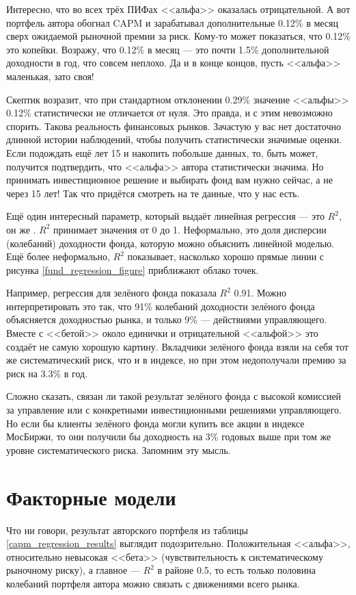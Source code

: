 Интересно, что во всех трёх ПИФах <<альфа>> оказалась отрицательной. А вот портфель автора обогнал CAPM и зарабатывал дополнительные 0.12\% в месяц сверх ожидаемой рыночной премии за риск. Кому-то может показаться, что 0.12\% это копейки. Возражу, что 0.12\% в месяц --- это почти 1.5\% дополнительной доходности в год, что совсем неплохо. Да и в конце концов, пусть <<альфа>> маленькая, зато своя!

Скептик возразит, что при стандартном отклонении 0.29\% значение <<альфы>> 0.12\% статистически не отличается от нуля. Это правда, и с этим невозможно спорить. Такова реальность финансовых рынков. Зачастую у вас нет достаточно длинной истории наблюдений, чтобы получить статистически значимые оценки. Если подождать ещё лет 15 и накопить побольше данных, то, быть может, получится подтвердить, что <<альфа>> автора статистически значима. Но принимать инвестиционное решение и выбирать фонд вам нужно сейчас, а не через 15 лет! Так что придётся смотреть на те данные, что у нас есть.

Ещё один интересный параметр, который выдаёт линейная регрессия --- это $R^2$, он же . $R^2$ принимает значения от 0 до 1. Неформально, это доля дисперсии (колебаний) доходности фонда, которую можно объяснить линейной моделью. Ещё более неформально, $R^2$ показывает, насколько хорошо прямые линии с рисунка \ref{fund_regression_figure} приближают облако точек.

Например, регрессия для зелёного фонда показала $R^2$ 0.91. Можно интерпретировать это так, что 91\% колебаний доходности зелёного фонда объясняется доходностью рынка, и только 9\% --- действиями управляющего. Вместе с <<бетой>> около единички и отрицательной <<альфой>> это создаёт не самую хорошую картину. Вкладчики зелёного фонда взяли на себя тот же систематический риск, что и в индексе, но при этом недополучали премию за риск на 3.3\% в год. 

Сложно сказать, связан ли такой результат зелёного фонда с высокой комиссией за управление или с конкретными инвестиционными решениями управляющего. Но если бы клиенты зелёного фонда могли купить все акции в индексе МосБиржи, то они получили бы доходность на 3\% годовых выше при том же уровне систематического риска. Запомним эту мысль.

\section*{Факторные модели}

Что ни говори, результат авторского портфеля из таблицы \ref{capm_regression_results} выглядит подозрительно. Положительная <<альфа>>, относительно невысокая <<бета>> (чувствительность к систематическому рыночному риску), а главное --- $R^2$ в районе 0.5, то есть только половина колебаний портфеля автора можно связать с движениями всего рынка.

